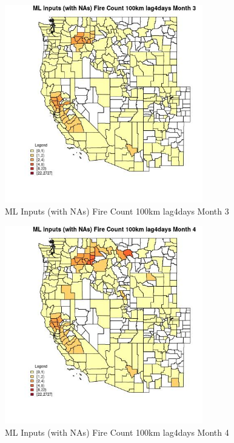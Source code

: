 \begin{figure} 
\centering  
\includegraphics[width=0.77\textwidth]{Code_Outputs/Report_ML_input_PM25_Step4_part_f_de_duplicated_aveswNAs_CountyFire_Count_100km_lag4daysmedianMonth3.jpg} 
\caption{\label{fig:Report_ML_input_PM25_Step4_part_f_de_duplicated_aveswNAsCountyFire_Count_100km_lag4daysmedianMonth3}ML Inputs (with NAs) Fire Count 100km lag4days Month 3} 
\end{figure} 
 

\begin{figure} 
\centering  
\includegraphics[width=0.77\textwidth]{Code_Outputs/Report_ML_input_PM25_Step4_part_f_de_duplicated_aveswNAs_CountyFire_Count_100km_lag4daysmedianMonth4.jpg} 
\caption{\label{fig:Report_ML_input_PM25_Step4_part_f_de_duplicated_aveswNAsCountyFire_Count_100km_lag4daysmedianMonth4}ML Inputs (with NAs) Fire Count 100km lag4days Month 4} 
\end{figure} 
 

